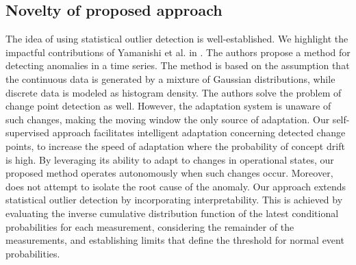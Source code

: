 \subsection{Novelty of proposed approach}
The idea of using statistical outlier detection is well-established. We highlight the impactful contributions of Yamanishi et al. in \citep{Yamanishi2002, Yamanishi2004}. The authors propose a method for detecting anomalies in a time series. The method is based on the assumption that the continuous data is generated by a mixture of Gaussian distributions, while discrete data is modeled as histogram density. The authors solve the problem of change point detection as well. However, the adaptation system is unaware of such changes, making the moving window the only source of adaptation.  Our self-supervised approach facilitates intelligent adaptation concerning detected change points, to increase the speed of adaptation where the probability of concept drift is high. By leveraging its ability to adapt to changes in operational states, our proposed method operates autonomously when such changes occur. Moreover, \citet{Yamanishi2004} does not attempt to isolate the root cause of the anomaly. Our approach extends statistical outlier detection by incorporating interpretability. This is achieved by evaluating the inverse cumulative distribution function of the latest conditional probabilities for each measurement, considering the remainder of the measurements, and establishing limits that define the threshold for normal event probabilities.

